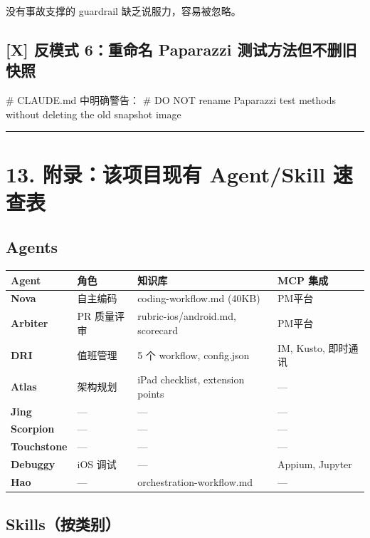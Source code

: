 没有事故支撑的 guardrail 缺乏说服力，容易被忽略。


\subsection{[X] 反模式 6：重命名 Paparazzi 测试方法但不删旧快照}

\begin{codeblock}
# CLAUDE.md 中明确警告：
# DO NOT rename Paparazzi test methods without deleting the old snapshot image
\end{codeblock}

\bigskip\hrule\bigskip

\section{13. 附录：该项目现有 Agent/Skill 速查表}

\subsection{Agents}

\begingroup
\scriptsize
\setlength{\tabcolsep}{3pt}
\begin{longtable}{|p{}|p{}|p{}|p{}|}
\hline
Agent & 角色 & 知识库 & MCP 集成 \\ \hline
\textbf{Nova} & 自主编码 & coding-workflow.md (40KB) & PM平台 \\ \hline
\textbf{Arbiter} & PR 质量评审 & rubric-ios/android.md, scorecard & PM平台 \\ \hline
\textbf{DRI} & 值班管理 & 5 个 workflow, config.json & IM, Kusto, 即时通讯 \\ \hline
\textbf{Atlas} & 架构规划 & iPad checklist, extension points & --- \\ \hline
\textbf{Jing} & --- & --- & --- \\ \hline
\textbf{Scorpion} & --- & --- & --- \\ \hline
\textbf{Touchstone} & --- & --- & --- \\ \hline
\textbf{Debuggy} & iOS 调试 & --- & Appium, Jupyter \\ \hline
\textbf{Hao} & --- & orchestration-workflow.md & --- \\ \hline
\end{longtable}
\endgroup

\subsection{Skills（按类别）}


